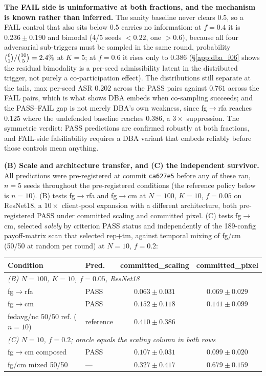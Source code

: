 \documentclass{article}
\begin{document}
\textbf{The FAIL side is uninformative at both fractions, and the mechanism is known rather than
inferred.} The sanity baseline never clears $0.5$, so a FAIL control that also sits below $0.5$
carries no information: at $f{=}0.4$ it is $0.236 \pm 0.190$ and bimodal (4/5 seeds $<0.22$, one
$>0.6$), because all four adversarial sub-triggers must be sampled in the same round, probability
$\tbinom{6}{1}/\tbinom{10}{5} = 2.4\%$ at $K{=}5$; at $f{=}0.6$ it rises only to $0.386$ (§\ref{app:dba_f06}
shows the residual bimodality is a per-seed admissibility latent in the distributed trigger, not
purely a co-participation effect). The distributions still separate at the tails, max per-seed ASR
$0.202$ across the PASS pairs against $0.761$ across the FAIL pairs, which is what shows DBA embeds
when co-sampling succeeds; and the PASS--FAIL gap is not merely DBA's own weakness, since fg$\to$rfa
reaches $0.125$ where the undefended baseline reaches $0.386$, a $3\times$ suppression. The
symmetric verdict: PASS predictions are confirmed robustly at both fractions, and FAIL-side
falsifiability requires a DBA variant that embeds reliably before those controls mean anything.

\textbf{(B) Scale and architecture transfer, and (C) the independent survivor.} All predictions were
pre-registered at commit \texttt{ca627e5} before any of these ran, $n{=}5$ seeds throughout the
pre-registered conditions (the reference policy below is $n{=}10$).
(B) tests fg$\to$rfa and fg$\to$cm at $N{=}100$, $K{=}10$, $f{=}0.05$ on ResNet18, a $10\times$
client-pool expansion with a different architecture, both pre-registered PASS under committed
scaling and committed pixel. (C) tests fg$\to$cm, selected \emph{solely} by criterion PASS status
and independently of the 189-config payoff-matrix scan that selected rep+tm, against temporal
mixing of fg/cm (50/50 at random per round) at $N{=}10$, $f{=}0.2$:

\begin{center}\small
\begin{tabular}{llcc}
\toprule
\textbf{Condition} & \textbf{Pred.} & \textbf{committed\_scaling} & \textbf{committed\_pixel} \\
\midrule
\multicolumn{4}{l}{\emph{(B) $N{=}100$, $K{=}10$, $f{=}0.05$, ResNet18}} \\
fg$\to$rfa & PASS & $0.063 \pm 0.031$ & $0.069 \pm 0.029$ \\
fg$\to$cm & PASS & $0.152 \pm 0.118$ & $0.141 \pm 0.099$ \\
fedavg/nc 50/50 ref. ($n{=}10$) & reference & $0.410 \pm 0.386$ & \\
\midrule
\multicolumn{4}{l}{\emph{(C) $N{=}10$, $f{=}0.2$; oracle equals the scaling column in both rows}} \\
fg$\to$cm composed & PASS & $0.107 \pm 0.031$ & $0.099 \pm 0.020$ \\
fg/cm mixed 50/50 & --- & $0.327 \pm 0.417$ & $0.679 \pm 0.159$ \\
\bottomrule
\end{tabular}
\end{center}
\end{document}
